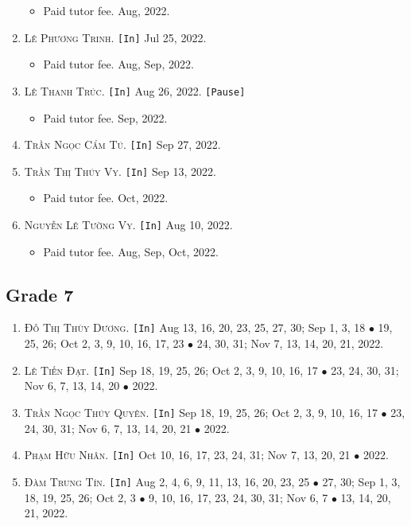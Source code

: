 \documentclass{article}
\numberwithin{equation}{section}
\begin{document}
\begin{enumerate}
	\begin{itemize}
		\item \textsf{Paid tutor fee.} Aug, 2022.
	\end{itemize}
	\item \textsc{Lê Phương Trinh.} \texttt{[In]} Jul 25, 2022.
	\begin{itemize}
		\item \textsf{Paid tutor fee.} Aug, Sep, 2022.
	\end{itemize}
	\item \textsc{Lê Thanh Trúc.} \texttt{[In]} Aug 26, 2022. \texttt{[Pause]}
	\begin{itemize}
		\item \textsf{Paid tutor fee.} Sep, 2022.
	\end{itemize}
	\item \textsc{Trần Ngọc Cẩm Tú.} \texttt{[In]} Sep 27, 2022.
	\item \textsc{Trần Thị Thúy Vy.} \texttt{[In]} Sep 13, 2022.
	\begin{itemize}
		\item \textsf{Paid tutor fee.} Oct, 2022.
	\end{itemize}
	\item \textsc{Nguyễn Lê Tường Vy.} \texttt{[In]} Aug 10, 2022.
	\begin{itemize}
		\item \textsf{Paid tutor fee.} Aug, Sep, Oct, 2022.
	\end{itemize}
\end{enumerate}

\subsection{Grade 7}
\begin{enumerate}
	\item \textsc{Đỗ Thị Thùy Dương.} \texttt{[In]} Aug 13, 16, 20, 23, 25, 27, 30; Sep 1, 3, 18 $\bullet$ 19, 25, 26; Oct 2, 3, 9, 10, 16, 17, 23 $\bullet$ 24, 30, 31; Nov 7, 13, 14, 20, 21, 2022.
	\item \textsc{Lê Tiến Đạt.} \texttt{[In]} Sep 18, 19, 25, 26; Oct 2, 3, 9, 10, 16, 17 $\bullet$ 23, 24, 30, 31; Nov 6, 7, 13, 14, 20 $\bullet$ 2022.
	\item \textsc{Trần Ngọc Thúy Quyên.} \texttt{[In]} Sep 18, 19, 25, 26; Oct 2, 3, 9, 10, 16, 17 $\bullet$ 23, 24, 30, 31; Nov 6, 7, 13, 14, 20, 21 $\bullet$ 2022.
	\item \textsc{Phạm Hữu Nhân.} \texttt{[In]} Oct 10, 16, 17, 23, 24, 31; Nov 7, 13, 20, 21 $\bullet$ 2022.
	\item \textsc{Đàm Trung Tín.} \texttt{[In]} Aug 2, 4, 6, 9, 11, 13, 16, 20, 23, 25 $\bullet$ 27, 30; Sep 1, 3, 18, 19, 25, 26; Oct 2, 3 $\bullet$ 9, 10, 16, 17, 23, 24, 30, 31; Nov 6, 7 $\bullet$ 13, 14, 20, 21, 2022.
\end{enumerate}
\end{document}
